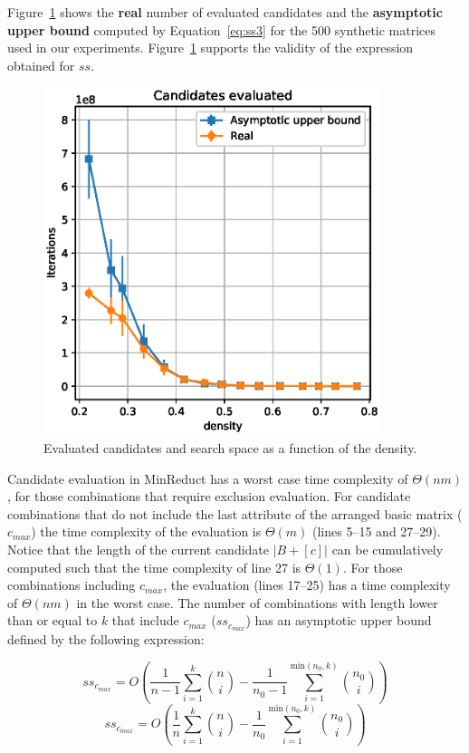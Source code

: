 \documentclass[citenumber]{llncs}
\begin{document}
	Figure~\ref{fig:candidates} shows the \textbf{real} number of evaluated candidates and the \textbf{asymptotic upper bound} computed by Equation~\ref{eq:ss3} for the 500 synthetic matrices used in our experiments. Figure~\ref{fig:candidates} supports the validity of the expression obtained for $ss$.
	
	\begin{figure}[hbt] 
		\begin{center}
			\includegraphics[height=4in]{Candidates_vs_SearchSpace.eps}
		\end{center}
		\caption{Evaluated candidates and search space as a function of the density.}\label{fig:candidates}
	\end{figure}  
	
	Candidate evaluation in MinReduct has a worst case time complexity of $\Theta(nm)$, for those combinations that require exclusion evaluation. For candidate combinations that do not include the last attribute of the arranged basic matrix ($c_{max}$) the time complexity of the evaluation is $\Theta(m)$ (lines 5--15 and 27--29). Notice that the length of the current candidate $|B+ [c]|$ can be cumulatively computed such that the time complexity of line 27 is $\Theta(1)$. For those combinations including $c_{max}$, the evaluation (lines 17--25) has a time complexity of $\Theta(nm)$ in the worst case. The number of combinations with length lower than or equal to $k$ that include $c_{max}$ ($ss_{c_{max}}$) has an asymptotic upper bound defined by the following expression:
	
	\begin{equation*}
	ss_{c_{max}}= O\left(\frac{1}{n-1}\sum_{i=1}^{k} \binom{n}{i} - \frac{1}{n_0-1}\sum_{i=1}^{\mathrm{min}(n_0,k)} \binom{n_0}{i}\right)\label{eq:c_max1}
	\end{equation*}
	\begin{equation}
	ss_{c_{max}}= O\left(\frac{1}{n}\sum_{i=1}^{k} \binom{n}{i} - \frac{1}{n_0}\sum_{i=1}^{\mathrm{min}(n_0,k)} \binom{n_0}{i}\right)\label{eq:c_max2}
	\end{equation}
	
\end{document}
